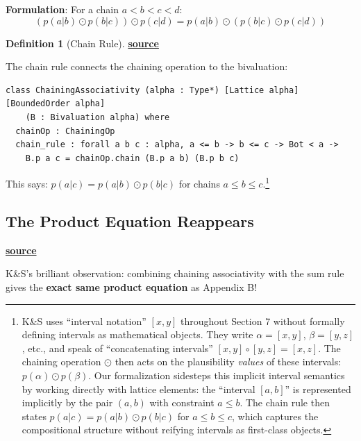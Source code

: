 \documentclass[11pt]{article}
\theoremstyle{definition}
\newtheorem{definition}[theorem]{Definition}
\theoremstyle{remark}
\begin{document}
\textbf{Formulation}: For a chain $a < b < c < d$:
\[ (p(a|b) \odot p(b|c)) \odot p(c|d) = p(a|b) \odot (p(b|c) \odot p(c|d)) \]

\begin{definition}[Chain Rule]
\textbf{\href{https://github.com/zariuq/ks-foundations-of-inference/blob/main/KnuthSkilling/Probability/ConditionalProbability/Basic.lean}{source}}

The chain rule connects the chaining operation to the bivaluation:
\end{definition}

\begin{lstlisting}[caption={\texttt{ChainingAssociativity} class (\href{https://github.com/zariuq/ks-foundations-of-inference/blob/main/KnuthSkilling/Probability/ConditionalProbability/Basic.lean}{Basic.lean})},numbers=none]
class ChainingAssociativity (alpha : Type*) [Lattice alpha] [BoundedOrder alpha]
    (B : Bivaluation alpha) where
  chainOp : ChainingOp
  chain_rule : forall a b c : alpha, a <= b -> b <= c -> Bot < a ->
    B.p a c = chainOp.chain (B.p a b) (B.p b c)
\end{lstlisting}

This says: $p(a|c) = p(a|b) \odot p(b|c)$ for chains $a \leq b \leq c$.\footnote{K\&S uses ``interval notation'' $[x,y]$ throughout Section 7 without formally defining intervals as mathematical objects. They write $\alpha = [x,y]$, $\beta = [y,z]$, etc., and speak of ``concatenating intervals'' $[x,y] \circ [y,z] = [x,z]$. The chaining operation $\odot$ then acts on the plausibility \emph{values} of these intervals: $p(\alpha) \odot p(\beta)$. Our formalization sidesteps this implicit interval semantics by working directly with lattice elements: the ``interval $[a,b]$'' is represented implicitly by the pair $(a, b)$ with constraint $a \leq b$. The chain rule then states $p(a|c) = p(a|b) \odot p(b|c)$ for $a \leq b \leq c$, which captures the compositional structure without reifying intervals as first-class objects.}

\subsection{The Product Equation Reappears}

\textbf{\href{https://github.com/zariuq/ks-foundations-of-inference/blob/main/KnuthSkilling/Probability/ConditionalProbability/Basic.lean}{source}}

K\&S's brilliant observation: combining chaining associativity with the sum rule gives the \textbf{exact same product equation} as Appendix B!
\end{document}
